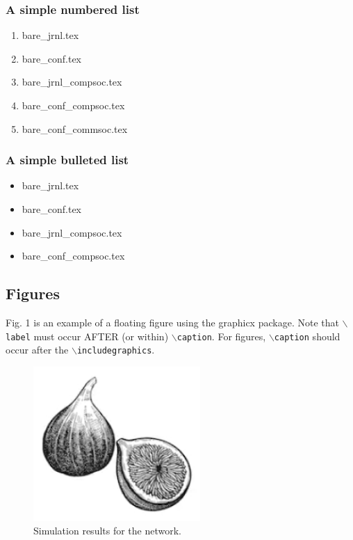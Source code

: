 \documentclass[journal,9pt]{IEEEtran}
\begin{document}
\subsubsection*{\bf A simple numbered list}
\begin{enumerate}
  \item{bare\_jrnl.tex}
  \item{bare\_conf.tex}
  \item{bare\_jrnl\_compsoc.tex}
  \item{bare\_conf\_compsoc.tex}
  \item{bare\_conf\_commsoc.tex}
\end{enumerate}

\subsubsection*{\bf A simple bulleted list}
\begin{itemize}
  \item{bare\_jrnl.tex}
  \item{bare\_conf.tex}
  \item{bare\_jrnl\_compsoc.tex}
  \item{bare\_conf\_compsoc.tex}
\end{itemize}

\newpage
\subsection{Figures}
Fig. 1 is an example of a floating figure using the graphicx package.
Note that $\backslash${\tt{label}} must occur AFTER (or within) $\backslash${\tt{caption}}.
For figures, $\backslash${\tt{caption}} should occur after the $\backslash${\tt{includegraphics}}.

\begin{figure}[!t]
  \centering
  \includegraphics[width=2.5in]{fig1}
  \caption{Simulation results for the network.}
  \label{fig_1}
\end{figure}
\end{document}
